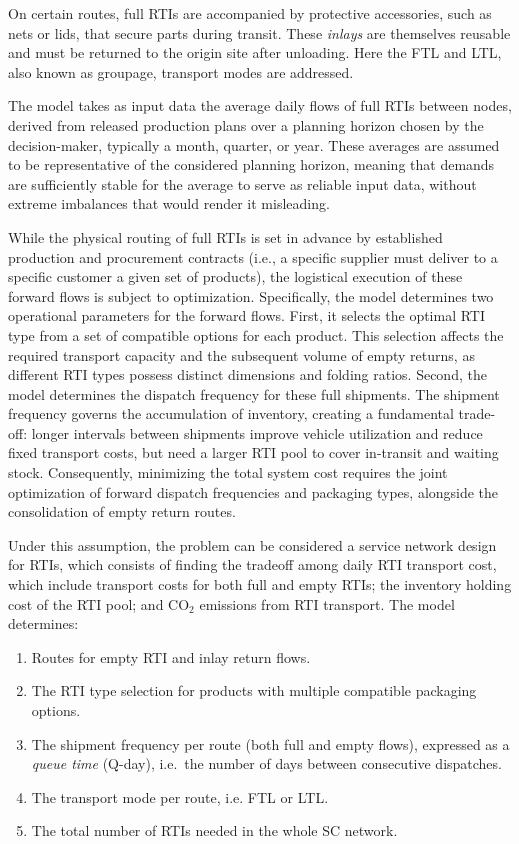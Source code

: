 On certain routes, full RTIs are accompanied by protective accessories,
such as nets or lids, that secure parts during transit. These
\textit{inlays} are themselves reusable and must be returned to the origin
site after unloading. Here the FTL and LTL, also known as groupage, transport modes are addressed. 

The model takes as input data the average daily flows of full RTIs between nodes, derived from released production plans over a planning horizon chosen by the decision-maker, typically a month, quarter, or year. These averages are assumed to be representative of the considered planning horizon, meaning that demands are sufficiently stable for the average to serve as reliable input data, without extreme imbalances that would render it misleading. 

{\color{blue}
While the physical routing of full RTIs is set in advance by established production and procurement contracts (i.e., a specific supplier must deliver to a specific customer a given set of products), the logistical execution of these forward flows is subject to optimization. Specifically, the model determines two operational parameters for the forward flows. First, it selects the optimal RTI type from a set of compatible options for each product. This selection affects the required transport capacity and the subsequent volume of empty returns, as different RTI types possess distinct dimensions and folding ratios. Second, the model determines the dispatch frequency for these full shipments. The shipment frequency governs the accumulation of inventory, creating a fundamental trade-off: longer intervals between shipments improve vehicle utilization and reduce fixed transport costs, but need a larger RTI pool to cover in-transit and waiting stock. Consequently, minimizing the total system cost requires the joint optimization of forward dispatch frequencies and packaging types, alongside the consolidation of empty return routes.
}

Under this assumption, the problem can be considered a service network design for RTIs, which consists of finding the tradeoff among daily RTI transport cost, which include transport costs for both full and empty RTIs; the inventory holding cost of the RTI pool; and CO$_2$ emissions from RTI transport. The model determines:

\begin{enumerate}
  \item Routes for empty RTI and inlay return flows.
  \item The RTI type selection for products with multiple compatible packaging options.
  \item The shipment frequency per route (both full and empty flows), expressed as a \textit{queue time} (Q-day), i.e.\ the number of days between consecutive dispatches.
  \item The transport mode per route, i.e. FTL or LTL.
  \item The total number of RTIs needed in the whole SC network.
\end{enumerate}

